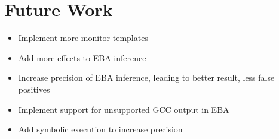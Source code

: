 \section{Future Work}

\begin{itemize}
    \item Implement more monitor templates
    \item Add more effects to EBA inference
    \item Increase precision of EBA inference, leading to better  result, less false positives
    \item Implement support for unsupported GCC output in EBA 
    \item Add symbolic execution to increase precision
\end{itemize}